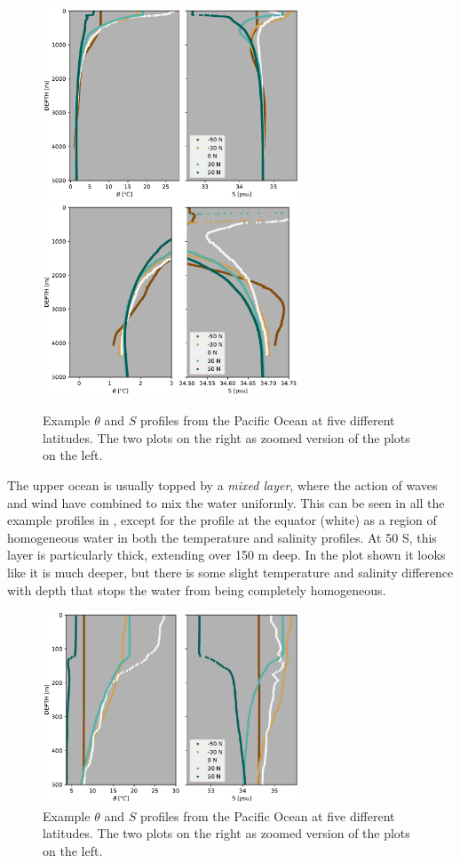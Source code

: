 \begin{figure}
  \centering
  \includegraphics[width=3in]{figs/WaterMasses/ExamplePacificProfiles}
  \includegraphics[width=3in]{figs/WaterMasses/ExamplePacificProfilesZoom}
    \caption{Example $\theta$ and $S$ profiles from the Pacific Ocean at five different latitudes.  The two plots on the right as zoomed version of the plots on the left.  }
    \label{fig:ExamplePacificProfiles}  
\end{figure}

The upper ocean is usually topped by a \emph{mixed layer}, where the action of waves and wind have combined to mix the water uniformly.  This can be seen in all the example profiles in , except for the profile at the equator (white) as a region of homogeneous water in both the temperature and salinity profiles.  At 50 S, this layer is particularly thick, extending over 150 m deep.  In the plot shown it looks like it is much deeper, but there is some slight temperature and salinity difference with depth that stops the water from being completely homogeneous.

\begin{figure}[htp]
  \centering
  \includegraphics[width=3in]{figs/WaterMasses/UpperPacProfile}
    \caption{Example $\theta$ and $S$ profiles from the Pacific Ocean at five different latitudes.  The two plots on the right as zoomed version of the plots on the left.  }
    \label{fig:UpperPacProfile}  
\end{figure}

